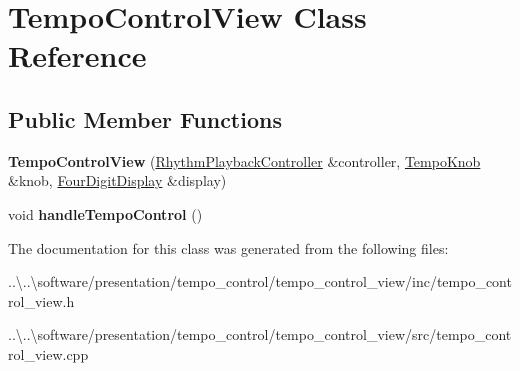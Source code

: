 \hypertarget{class_tempo_control_view}{}\section{Tempo\+Control\+View Class Reference}
\label{class_tempo_control_view}
\subsection*{Public Member Functions}
\begin{DoxyCompactItemize}
\item 
\mbox{\label{class_tempo_control_view_a7fa038833fdcbf54387da7722b963110}} 
{\bfseries Tempo\+Control\+View} (\mbox{\hyperlink{class_rhythm_playback_controller}{Rhythm\+Playback\+Controller}} \&controller, \mbox{\hyperlink{class_tempo_knob}{Tempo\+Knob}} \&knob, \mbox{\hyperlink{class_four_digit_display}{Four\+Digit\+Display}} \&display)
\item 
\mbox{\label{class_tempo_control_view_a878bf24175c64c6caea1e5ae037783cc}} 
void {\bfseries handle\+Tempo\+Control} ()
\end{DoxyCompactItemize}


The documentation for this class was generated from the following files\+:\begin{DoxyCompactItemize}
\item 
..\textbackslash{}..\textbackslash{}software/presentation/tempo\+\_\+control/tempo\+\_\+control\+\_\+view/inc/tempo\+\_\+control\+\_\+view.\+h\item 
..\textbackslash{}..\textbackslash{}software/presentation/tempo\+\_\+control/tempo\+\_\+control\+\_\+view/src/tempo\+\_\+control\+\_\+view.\+cpp\end{DoxyCompactItemize}
